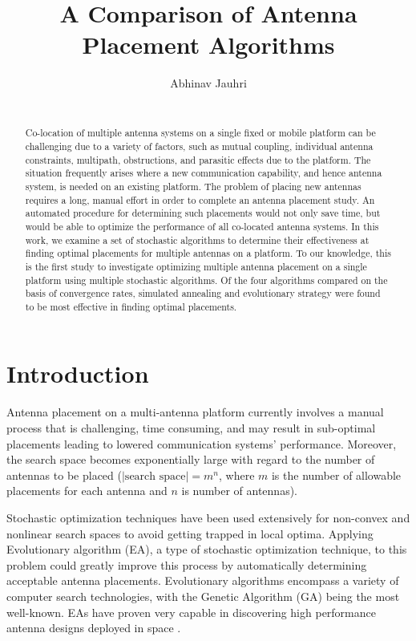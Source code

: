 \documentclass{sig-alternate}
\title{A Comparison of Antenna Placement Algorithms}
\author{\alignauthor
    Abhinav Jauhri\\
    \affaddr{Carnegie Mellon University}\\
\email{ajauhri@cmu.edu}}
\begin{document}
\maketitle
\begin{abstract}
Co-location of multiple antenna systems on a single fixed or mobile platform can be challenging due to a variety of factors, such as mutual coupling, individual antenna constraints, multipath, obstructions, and parasitic effects due to the platform. The situation frequently arises where a new communication capability, and hence antenna system, is needed on an existing platform. The problem of placing new antennas requires a long, manual effort in order to complete an antenna placement study. An automated procedure for determining such placements would not only save time, but would be able to optimize the performance of all co-located antenna systems. In this work, we examine a set of stochastic algorithms to determine their effectiveness at finding optimal placements for multiple antennas on a platform. To our knowledge, this is the first study to investigate optimizing multiple antenna placement on a single platform using multiple stochastic algorithms. Of the four algorithms compared on the basis of convergence rates, simulated annealing and evolutionary strategy were found to be most effective in finding optimal placements.
\end{abstract}

\section{Introduction}
Antenna placement on a multi-antenna platform currently involves a manual process that is challenging, time consuming, and may result in sub-optimal placements leading to lowered communication systems' performance. Moreover, the search space becomes exponentially large with regard to the number of antennas to be placed ($|\text{search space}| = m^n$, where $m$ is the number of allowable placements for each antenna and $n$ is number of antennas). 

Stochastic optimization techniques have been used extensively for non-convex and nonlinear search spaces to avoid getting trapped in local optima. Applying Evolutionary algorithm (EA), a type of stochastic optimization technique, to this problem could greatly improve this process by automatically determining acceptable antenna placements. Evolutionary algorithms encompass a variety of computer search technologies, with the Genetic Algorithm (GA) being the most well-known. EAs have proven very capable in discovering high performance antenna designs deployed in space \cite{lohn2005evolutionary}. 
\end{document}
